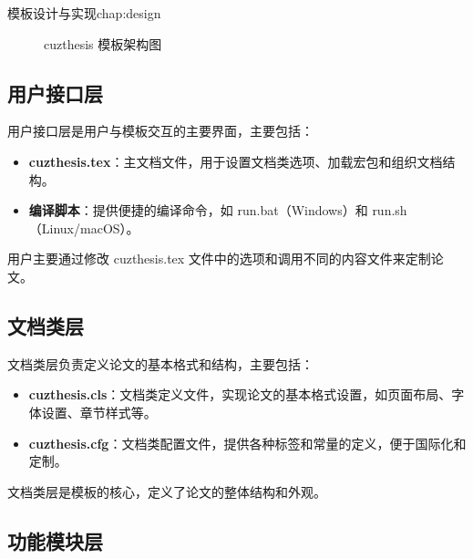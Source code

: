 \begin{cuzchapter}{模板设计与实现}{chap:design}
\begin{figure}[htbp]
        \caption{cuzthesis 模板架构图}
        \label{fig:architecture}
    \end{figure}
    
    \subsection{用户接口层}
    
    用户接口层是用户与模板交互的主要界面，主要包括：
    
    \begin{itemize}
        \item \textbf{cuzthesis.tex}：主文档文件，用于设置文档类选项、加载宏包和组织文档结构。
        
        \item \textbf{编译脚本}：提供便捷的编译命令，如 run.bat（Windows）和 run.sh（Linux/macOS）。
    \end{itemize}
    
    用户主要通过修改 cuzthesis.tex 文件中的选项和调用不同的内容文件来定制论文。
    
    \subsection{文档类层}
    
    文档类层负责定义论文的基本格式和结构，主要包括：
    
    \begin{itemize}
        \item \textbf{cuzthesis.cls}：文档类定义文件，实现论文的基本格式设置，如页面布局、字体设置、章节样式等。
        
        \item \textbf{cuzthesis.cfg}：文档类配置文件，提供各种标签和常量的定义，便于国际化和定制。
    \end{itemize}
    
    文档类层是模板的核心，定义了论文的整体结构和外观。
    
    \subsection{功能模块层}
    

\end{cuzchapter}
